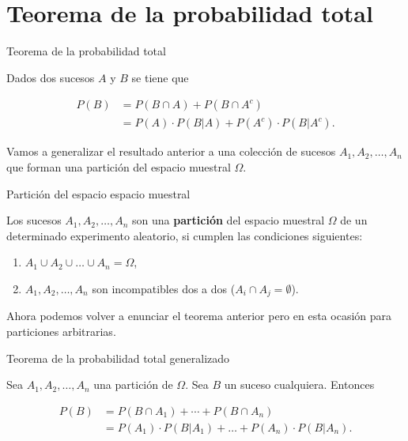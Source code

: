 \documentclass[
  letterpaper,
  DIV=11,
  numbers=noendperiod]{scrreprt}
\providecommand{\tightlist}{%
  \setlength{\itemsep}{0pt}\setlength{\parskip}{0pt}}\usepackage{longtable,booktabs,array}
\begin{document}
\section{Teorema de la probabilidad
total}\label{teorema-de-la-probabilidad-total}

\begin{Teorema}{Teorema de la probabilidad total}{}

Dados dos sucesos \(A\) y \(B\) se tiene que

\[
\begin{array}{rl}
P(B)&= P(B\cap A) +P(B\cap A^c)\\
& =P(A)\cdot P(B|A)+ P(A^c)\cdot P(B|A^c).
\end{array}
\]

\end{Teorema}

Vamos a generalizar el resultado anterior a una colección de sucesos
\(A_1,A_2,\ldots,A_n\) que forman una partición del espacio muestral
\(\Omega\).

\begin{Definicion}{Partición del espacio espacio muestral}{}

Los sucesos \(A_1,A_2,\ldots, A_n\) son una \textbf{partición} del
espacio muestral \(\Omega\) de un determinado experimento aleatorio, si
cumplen las condiciones siguientes:

\begin{enumerate}
\def\labelenumi{\arabic{enumi}.}
\tightlist
\item
  \(A_1\cup A_2\cup\ldots\cup A_n=\Omega\),
\item
  \(A_1,A_2,\ldots,A_n\) son incompatibles dos a dos
  (\(A_i\cap A_j=\emptyset\)).
\end{enumerate}

\end{Definicion}

Ahora podemos volver a enunciar el teorema anterior pero en esta ocasión
para particiones arbitrarias.

\begin{Teorema}{Teorema de la probabilidad total generalizado}{}

Sea \(A_1,A_2,\ldots,A_n\) una partición de \(\Omega\). Sea \(B\) un
suceso cualquiera. Entonces

\[
\begin{array}{rl}
P(B)&= P(B\cap A_1)+\cdots +P(B\cap A_n)\\
& =P(A_1)\cdot P(B|A_1)+\ldots+P(A_n)\cdot P(B|A_n).
\end{array}
\]

\end{Teorema}
\end{document}
